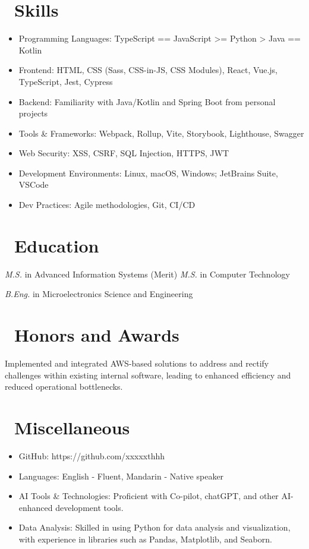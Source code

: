 \documentclass{resume}
\begin{document}
\section{\faCogs\ Skills}
\begin{itemize}[parsep=0.5ex]
  \item Programming Languages: TypeScript == JavaScript >= Python > Java == Kotlin
  \item Frontend: HTML, CSS (Sass, CSS-in-JS, CSS Modules), React, Vue.js, TypeScript, Jest, Cypress
  \item Backend: Familiarity with Java/Kotlin and Spring Boot from personal projects
  \item Tools \& Frameworks: Webpack, Rollup, Vite, Storybook, Lighthouse, Swagger
  \item Web Security: XSS, CSRF, SQL Injection, HTTPS, JWT
  \item Development Environments: Linux, macOS, Windows; JetBrains Suite, VSCode
  \item Dev Practices: Agile methodologies, Git, CI/CD
\end{itemize}

\section{\faGraduationCap\ Education}
\textit{M.S.} in Advanced Information Systems (Merit)
\textit{M.S.} in Computer Technology

\textit{B.Eng.} in Microelectronics Science and Engineering

\section{\faHeartO\ Honors and Awards}
Implemented and integrated AWS-based solutions to address and rectify challenges within existing internal software, leading to enhanced efficiency and reduced operational bottlenecks.


\section{\faInfo\ Miscellaneous}
\begin{itemize}[parsep=0.5ex]
  \item GitHub: https://github.com/xxxxxthhh
  \item Languages: English - Fluent, Mandarin - Native speaker
  \item AI Tools \& Technologies: Proficient with Co-pilot, chatGPT, and other AI-enhanced development tools.
  \item Data Analysis: Skilled in using Python for data analysis and visualization, with experience in libraries such as Pandas, Matplotlib, and Seaborn.
\end{itemize}

%
%
\end{document}
